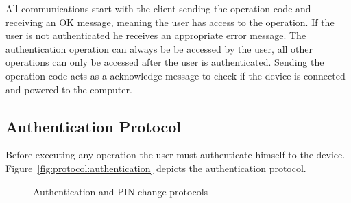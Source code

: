 All communications start with the client sending the operation code and receiving an OK message, meaning the user has access to the operation. If the user is not authenticated he receives an appropriate error message.
The authentication operation can always be be accessed by the user, all other operations can only be accessed after the user is authenticated.
Sending the operation code acts as a acknowledge message to check if the device is connected and powered to the computer.

\subsection{Authentication Protocol}\label{chap:implementation:protocol:auth}

Before executing any operation the user must authenticate himself to the device.
Figure~\ref{fig:protocol:authentication} depicts the authentication protocol.

\begin{figure}[h!]
	\centering     %
	\caption{Authentication and PIN change protocols}
\end{figure}

